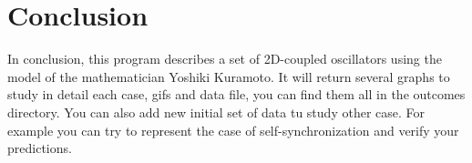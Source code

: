 \documentclass[1pt, a4paper]{article}
\begin{document}
\section{Conclusion}
\label{sec:conclusion}
In conclusion, this program describes a set of 2D-coupled oscillators using the model of the mathematician Yoshiki Kuramoto. It will return several graphs to study in detail each case, gifs and data file, you can find them all in the outcomes directory. You can also add new initial set of data tu study other case. For example you can try to represent the case of self-synchronization and verify your predictions. 

\newpage


\end{document}
